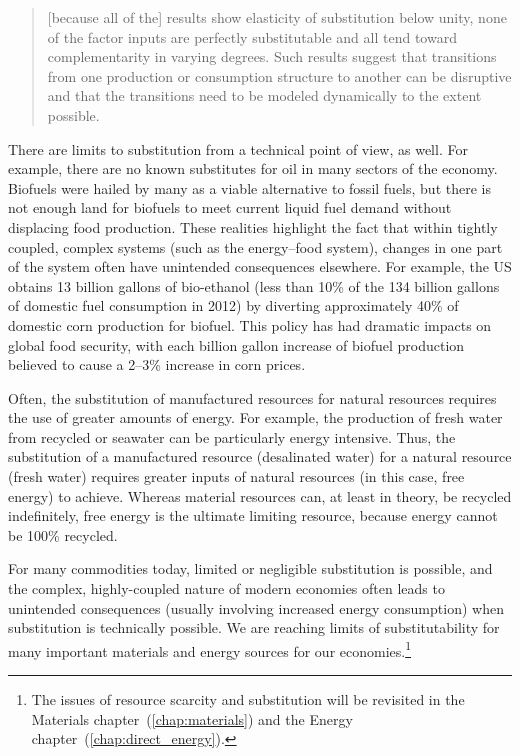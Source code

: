 \begin{quote}
	[because all of the] results show elasticity of substitution below unity, 
	none of the factor inputs are perfectly substitutable and 
	all tend toward complementarity in varying degrees. 
	Such results suggest that transitions 
	from one production or consumption structure to another 
	can be disruptive and that the transitions 
	need to be modeled dynamically to the extent possible.\cite[p.~8]{de-Wit:2013aa}
\end{quote}

There are limits to substitution from a technical point of view, as well.
For example, there are no known substitutes for oil 
in many sectors of the economy.\cite{Hirsch2005}
Biofuels were hailed by many as a viable alternative to fossil fuels, but
there is not enough land for biofuels to meet current liquid fuel demand
without displacing food production.
These realities highlight the fact that within tightly coupled, 
complex systems (such as the energy--food system), %
changes in one part of the system often have unintended consequences elsewhere.
For example, 
the US obtains 13 billion gallons of bio-ethanol 
(less than 10\% of the 134 billion gallons of domestic fuel consumption in 2012)
by diverting approximately 40\%
of domestic corn production for biofuel.\cite{EIA2014, USDA2014}
This policy has had dramatic impacts on global food security,
with each billion gallon increase of biofuel production believed to cause
a 2--3\% increase in corn prices.\cite{Kemick2013} 

Often, the substitution of manufactured resources for natural resources
requires the use of greater amounts of energy.
For example, the production of fresh water from recycled or seawater
can be particularly energy intensive.
Thus, the substitution of a manufactured resource (desalinated water)
for a natural resource (fresh water)
requires greater inputs of natural resources (in this case, free energy) to achieve.
Whereas material resources can, at least in theory,
be recycled indefinitely,
free energy is the ultimate limiting resource, 
because energy cannot be 100\% recycled.

For many commodities today, limited or negligible substitution is possible,
and the complex, highly-coupled nature of modern economies
often leads to unintended consequences (usually involving increased energy consumption)
when substitution is technically possible.
We are reaching limits of substitutability for many important 
materials and energy sources for our 
economies.\footnote{The issues of resource scarcity and substitution
	will be revisited in 
	the Materials chapter~(\ref{chap:materials}) and
	the Energy chapter~(\ref{chap:direct_energy}).}


